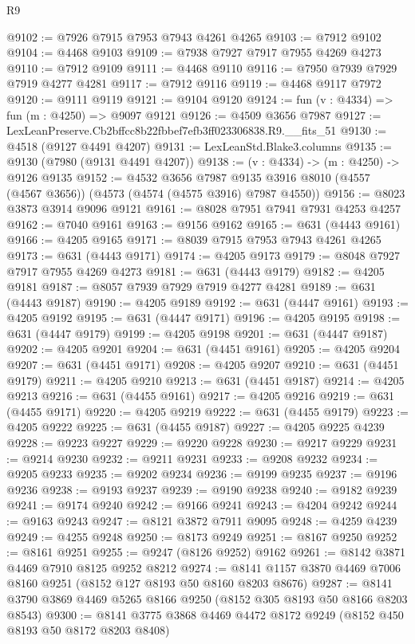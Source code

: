 \begin{lexlean}{R9}
\begin{coremodule}
@9102 := @7926 @7915 @7953 @7943 @4261 @4265
@9103 := @7912 @9102
@9104 := @4468 @9103
@9109 := @7938 @7927 @7917 @7955 @4269 @4273
@9110 := @7912 @9109
@9111 := @4468 @9110
@9116 := @7950 @7939 @7929 @7919 @4277 @4281
@9117 := @7912 @9116
@9119 := @4468 @9117 @7972
@9120 := @9111 @9119
@9121 := @9104 @9120
@9124 := fun (v : @4334) => fun (m : @4250) => @9097 @9121
@9126 := @4509 @3656 @7987
@9127 := LexLeanPreserve.Cb2bffcc8b22fbbef7efb3ff023306838.R9.__fits_51
@9130 := @4518 (@9127 @4491 @4207)
@9131 := LexLeanStd.Blake3.columns
@9135 := @9130 (@7980 (@9131 @4491 @4207))
@9138 := (v : @4334) -> (m : @4250) -> @9126 @9135
@9152 := @4532
    @3656
    @7987
    @9135
    @3916
    @8010
    (@4557 (@4567 @3656))
    (@4573 (@4574 (@4575 @3916) @7987 @4550))
@9156 := @8023 @3873 @3914 @9096 @9121
@9161 := @8028 @7951 @7941 @7931 @4253 @4257
@9162 := @7040 @9161
@9163 := @9156 @9162
@9165 := @631 (@4443 @9161)
@9166 := @4205 @9165
@9171 := @8039 @7915 @7953 @7943 @4261 @4265
@9173 := @631 (@4443 @9171)
@9174 := @4205 @9173
@9179 := @8048 @7927 @7917 @7955 @4269 @4273
@9181 := @631 (@4443 @9179)
@9182 := @4205 @9181
@9187 := @8057 @7939 @7929 @7919 @4277 @4281
@9189 := @631 (@4443 @9187)
@9190 := @4205 @9189
@9192 := @631 (@4447 @9161)
@9193 := @4205 @9192
@9195 := @631 (@4447 @9171)
@9196 := @4205 @9195
@9198 := @631 (@4447 @9179)
@9199 := @4205 @9198
@9201 := @631 (@4447 @9187)
@9202 := @4205 @9201
@9204 := @631 (@4451 @9161)
@9205 := @4205 @9204
@9207 := @631 (@4451 @9171)
@9208 := @4205 @9207
@9210 := @631 (@4451 @9179)
@9211 := @4205 @9210
@9213 := @631 (@4451 @9187)
@9214 := @4205 @9213
@9216 := @631 (@4455 @9161)
@9217 := @4205 @9216
@9219 := @631 (@4455 @9171)
@9220 := @4205 @9219
@9222 := @631 (@4455 @9179)
@9223 := @4205 @9222
@9225 := @631 (@4455 @9187)
@9227 := @4205 @9225 @4239
@9228 := @9223 @9227
@9229 := @9220 @9228
@9230 := @9217 @9229
@9231 := @9214 @9230
@9232 := @9211 @9231
@9233 := @9208 @9232
@9234 := @9205 @9233
@9235 := @9202 @9234
@9236 := @9199 @9235
@9237 := @9196 @9236
@9238 := @9193 @9237
@9239 := @9190 @9238
@9240 := @9182 @9239
@9241 := @9174 @9240
@9242 := @9166 @9241
@9243 := @4204 @9242
@9244 := @9163 @9243
@9247 := @8121 @3872 @7911 @9095
@9248 := @4259 @4239
@9249 := @4255 @9248
@9250 := @8173 @9249
@9251 := @8167 @9250
@9252 := @8161 @9251
@9255 := @9247 (@8126 @9252) @9162
@9261 := @8142 @3871 @4469 @7910 @8125 @9252 @8212
@9274 := @8141 @1157 @3870 @4469 @7006 @8160 @9251 (@8152 @127 @8193 @50 @8160 @8203 @8676)
@9287 := @8141 @3790 @3869 @4469 @5265 @8166 @9250 (@8152 @305 @8193 @50 @8166 @8203 @8543)
@9300 := @8141 @3775 @3868 @4469 @4472 @8172 @9249 (@8152 @450 @8193 @50 @8172 @8203 @8408)

\end{coremodule}
\end{lexlean}
